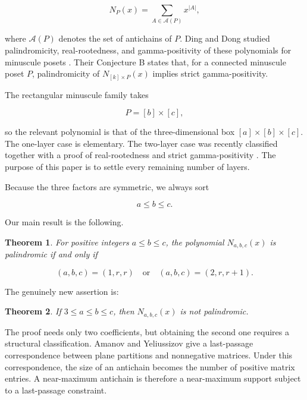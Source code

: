 \documentclass[11pt]{article}
\newtheorem{theorem}{Theorem}[section]
\numberwithin{equation}{section}
\begin{document}
\nopagebreak[4]
\[
N_P(x)=\sum_{A\in\mathcal A(P)}x^{|A|},
\]

where $\mathcal A(P)$ denotes the set of antichains of $P$. Ding and Dong
studied palindromicity, real-rootedness, and gamma-positivity of these
polynomials for minuscule posets \cite{ding2019}. Their Conjecture B states that, for a
connected minuscule poset $P$, palindromicity of
$N_{[k]\times P}(x)$ implies strict gamma-positivity.

The rectangular minuscule family takes

\nopagebreak[4]
\[
P=[b]\times[c],
\]

so the relevant polynomial is that of the three-dimensional box
$[a]\times[b]\times[c]$. The one-layer case is elementary. The two-layer
case was recently classified together with a proof of real-rootedness and
strict gamma-positivity \cite{carptopus2026}. The purpose of this paper is to settle every
remaining number of layers.

Because the three factors are symmetric, we always sort

\nopagebreak[4]
\[
a\le b\le c.
\]

Our main result is the following.

\Needspace{0.25\textheight}
\begin{theorem}

For positive integers $a\le b\le c$, the polynomial $N_{a,b,c}(x)$ is
palindromic if and only if

\nopagebreak[4]
\[
(a,b,c)=(1,r,r)
\quad\text{or}\quad
(a,b,c)=(2,r,r+1).
\]

\end{theorem}

The genuinely new assertion is:

\Needspace{0.25\textheight}
\begin{theorem}

If $3\le a\le b\le c$, then $N_{a,b,c}(x)$ is not palindromic.

\end{theorem}

The proof needs only two coefficients, but obtaining the second one requires
a structural classification. Amanov and Yeliussizov \cite{amanov2023} give a last-passage
correspondence between plane partitions and nonnegative matrices. Under this
correspondence, the size of an antichain becomes the number of positive
matrix entries. A near-maximum antichain is therefore a near-maximum support
subject to a last-passage constraint.
\end{document}
